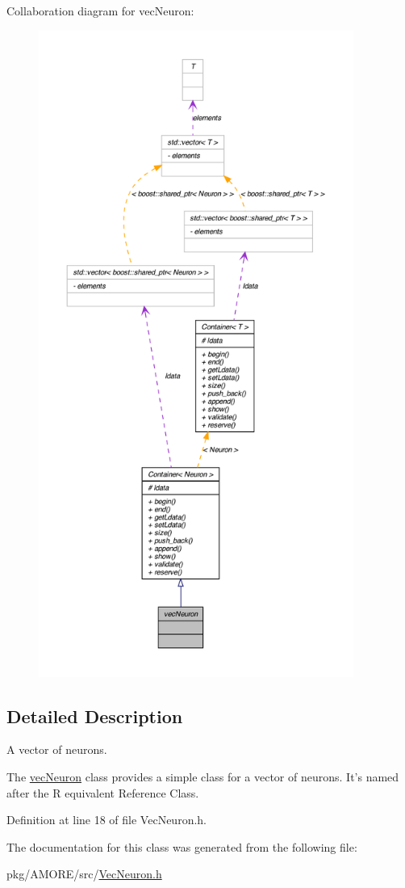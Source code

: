 Collaboration diagram for vecNeuron:
\nopagebreak
\begin{figure}[H]
\begin{center}
\leavevmode
\includegraphics[height=600pt]{classvec_neuron__coll__graph}
\end{center}
\end{figure}


\subsection{Detailed Description}
A vector of neurons. 

The \hyperlink{classvec_neuron}{vecNeuron} class provides a simple class for a vector of neurons. It's named after the R equivalent Reference Class. 

Definition at line 18 of file VecNeuron.h.



The documentation for this class was generated from the following file:\begin{DoxyCompactItemize}
\item 
pkg/AMORE/src/\hyperlink{_vec_neuron_8h}{VecNeuron.h}\end{DoxyCompactItemize}
